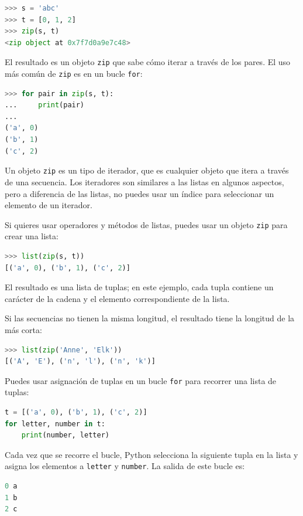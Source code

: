 \begin{lstlisting}[language=Python]
>>> s = 'abc'
>>> t = [0, 1, 2]
>>> zip(s, t)
<zip object at 0x7f7d0a9e7c48>
\end{lstlisting}

El resultado es un objeto \texttt{zip} que sabe cómo iterar a través de los pares. El uso más común de \texttt{zip} es en un bucle \texttt{for}:

\begin{lstlisting}[language=Python]
>>> for pair in zip(s, t):
...     print(pair)
...
('a', 0)
('b', 1)
('c', 2)
\end{lstlisting}

Un objeto \texttt{zip} es un tipo de iterador, que es cualquier objeto que itera a través de una secuencia. Los iteradores son similares a las listas en algunos aspectos, pero a diferencia de las listas, no puedes usar un índice para seleccionar un elemento de un iterador.

Si quieres usar operadores y métodos de listas, puedes usar un objeto \texttt{zip} para crear una lista:

\begin{lstlisting}[language=Python]
>>> list(zip(s, t))
[('a', 0), ('b', 1), ('c', 2)]
\end{lstlisting}

El resultado es una lista de tuplas; en este ejemplo, cada tupla contiene un carácter de la cadena y el elemento correspondiente de la lista.

Si las secuencias no tienen la misma longitud, el resultado tiene la longitud de la más corta:

\begin{lstlisting}[language=Python]
>>> list(zip('Anne', 'Elk'))
[('A', 'E'), ('n', 'l'), ('n', 'k')]
\end{lstlisting}

Puedes usar asignación de tuplas en un bucle \texttt{for} para recorrer una lista de tuplas:

\begin{lstlisting}[language=Python]
t = [('a', 0), ('b', 1), ('c', 2)]
for letter, number in t:
    print(number, letter)
\end{lstlisting}

Cada vez que se recorre el bucle, Python selecciona la siguiente tupla en la lista y asigna los elementos a \texttt{letter} y \texttt{number}. La salida de este bucle es:

\begin{lstlisting}[language=Python]
0 a
1 b
2 c
\end{lstlisting}

